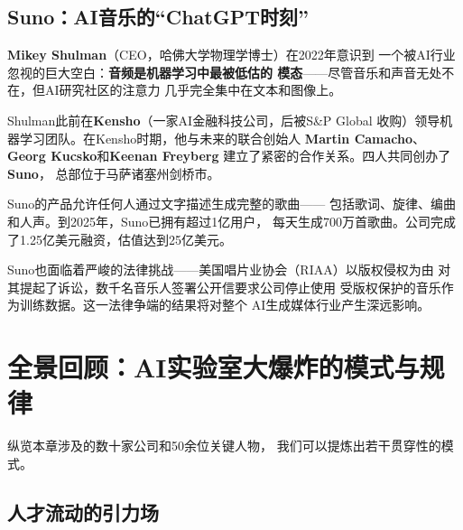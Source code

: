 \subsection{Suno：AI音乐的``ChatGPT时刻''}

\textbf{Mikey Shulman}（CEO，哈佛大学物理学博士）在2022年意识到
一个被AI行业忽视的巨大空白：\textbf{音频是机器学习中最被低估的
模态}——尽管音乐和声音无处不在，但AI研究社区的注意力
几乎完全集中在文本和图像上。

Shulman此前在\textbf{Kensho}（一家AI金融科技公司，后被S\&P Global
收购）领导机器学习团队。在Kensho时期，他与未来的联合创始人
\textbf{Martin Camacho}、\textbf{Georg Kucsko}和\textbf{Keenan Freyberg}
建立了紧密的合作关系。四人共同创办了\textbf{Suno}，
总部位于马萨诸塞州剑桥市。

Suno的产品允许任何人通过文字描述生成完整的歌曲——
包括歌词、旋律、编曲和人声。到2025年，Suno已拥有超过1亿用户，
每天生成700万首歌曲。公司完成了1.25亿美元融资，估值达到25亿美元。

Suno也面临着严峻的法律挑战——美国唱片业协会（RIAA）以版权侵权为由
对其提起了诉讼，数千名音乐人签署公开信要求公司停止使用
受版权保护的音乐作为训练数据。这一法律争端的结果将对整个
AI生成媒体行业产生深远影响。


\section{全景回顾：AI实验室大爆炸的模式与规律}
\label{sec:patterns}

纵览本章涉及的数十家公司和50余位关键人物，
我们可以提炼出若干贯穿性的模式。

\subsection{人才流动的引力场}


